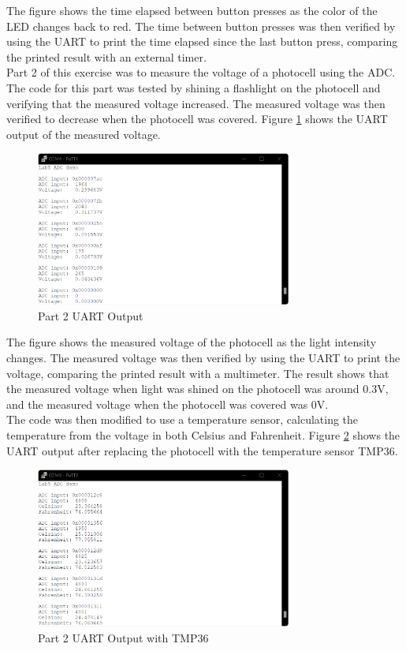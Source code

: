 \documentclass[CMPE]{KGCOEReport}
\begin{document}
The figure shows the time elapsed between button presses as the color of the LED changes back to red. The time between button presses was then verified by using the UART to print the time elapsed since the last button press, comparing the printed result with an external timer.\\

Part 2 of this exercise was to measure the voltage of a photocell using the ADC. The code for this part was tested by shining a flashlight on the photocell and verifying that the measured voltage increased. The measured voltage was then verified to decrease when the photocell was covered. Figure \ref{fig:part2a} shows the UART output of the measured voltage.

\begin{figure}[H]
    \centering
    \includegraphics[width=0.75\textwidth]{part2a.png}
    \caption{Part 2 UART Output}
    \label{fig:part2a}
\end{figure}

The figure shows the measured voltage of the photocell as the light intensity changes. The measured voltage was then verified by using the UART to print the voltage, comparing the printed result with a multimeter. The result shows that the measured voltage when light was shined on the photocell was around 0.3V, and the measured voltage when the photocell was covered was 0V.\\

The code was then modified to use a temperature sensor, calculating the temperature from the voltage in both Celsius and Fahrenheit. Figure \ref{fig:part2b} shows the UART output after replacing the photocell with the temperature sensor TMP36.

\begin{figure}[H]
    \centering
    \includegraphics[width=0.75\textwidth]{part2b.png}
    \caption{Part 2 UART Output with TMP36}
    \label{fig:part2b}
\end{figure}
\end{document}
